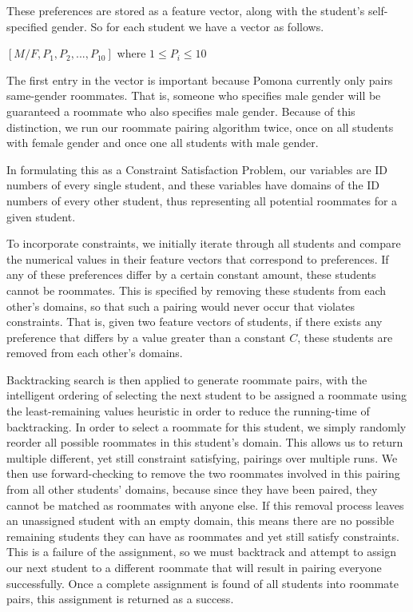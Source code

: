 \documentclass[letterpaper]{article}
\begin{document}
These preferences are stored as a feature vector, along with the student's self-specified gender. So for each student we have a vector as follows.

\begin{center}
	$[M/F, P_1, P_2, ..., P_{10}]$ where $1 \leq P_i \leq 10$
\end{center}

The first entry in the vector is important because Pomona currently only pairs same-gender roommates. That is, someone who specifies male gender will be guaranteed a roommate who also specifies male gender. Because of this distinction, we run our roommate pairing algorithm twice, once on all students with female gender and once one all students with male gender.

In formulating this as a Constraint Satisfaction Problem, our variables are ID numbers of every single student, and these variables have domains of the ID numbers of every other student, thus representing all potential roommates for a given student. 

To incorporate constraints, we initially iterate through all students and compare the numerical values in their feature vectors that correspond to preferences. If any of these preferences differ by a certain constant amount, these students cannot be roommates. This is specified by removing these students from each other's domains, so that such a pairing would never occur that violates constraints. That is, given two feature vectors of students, if there exists any preference that differs by a value greater than a constant $C$, these students are removed from each other's domains.

Backtracking search is then applied to generate roommate pairs, with the intelligent ordering of selecting the next student to be assigned a roommate using the least-remaining values heuristic in order to reduce the running-time of backtracking. In order to select a roommate for this student, we simply randomly reorder all possible roommates in this student's domain. This allows us to return multiple different, yet still constraint satisfying, pairings over multiple runs. We then use forward-checking to remove the two roommates involved in this pairing from all other students' domains, because since they have been paired, they cannot be matched as roommates with anyone else. If this removal process leaves an unassigned student with an empty domain, this means there are no possible remaining students they can have as roommates and yet still satisfy constraints. This is a failure of the assignment, so we must backtrack and attempt to assign our next student to a different roommate that will result in pairing everyone successfully. Once a complete assignment is found of all students into roommate pairs, this assignment is returned as a success.
\end{document}
